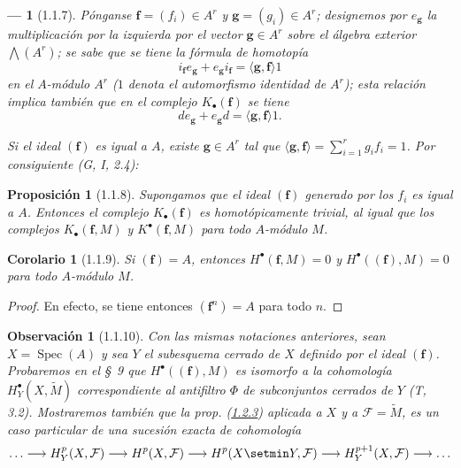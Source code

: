 \documentclass[10pt,oneside,openany]{book}
\theoremstyle{egaenv}\newtheorem*{env}{---}
\theoremstyle{egastatement}
\newtheorem*{proposition}{Proposición}
\newtheorem*{corollary}{Corolario}
\theoremstyle{egadescription}
\newtheorem*{remark}{Observación}
\begin{document}
\begin{env}[1.1.7]
\label{III.1.1.7}
\label{III.1.1.7-fr}
Pónganse $\mathbf f=(f_i)\in A^r$ y $\mathbf g=(g_i)\in A^r$; designemos por $e_{\mathbf g}$ la multiplicación por la izquierda por el vector $\mathbf g\in A^r$ sobre el álgebra exterior $\bigwedge(A^r)$; se sabe que se tiene la \emph{fórmula de homotopía}
\begin{equation}
\label{III.1.1.7.1-fr}
\tag{1.1.7.1}
i_{\mathbf f}e_{\mathbf g}+e_{\mathbf g}i_{\mathbf f}
=\langle\mathbf g,\mathbf f\rangle 1
\end{equation}
en el $A$-módulo $A^r$ ($1$ denota el automorfismo identidad de $A^r$); esta relación implica también que \emph{en el complejo $K_\bullet(\mathbf f)$} se tiene
\begin{equation}
\label{III.1.1.7.2-fr}
\tag{1.1.7.2}
de_{\mathbf g}+e_{\mathbf g}d=\langle\mathbf g,\mathbf f\rangle 1.
\end{equation}

Si el ideal $(\mathbf f)$ es igual a $A$, existe $\mathbf g\in A^r$ tal que $\langle\mathbf g,\mathbf f\rangle=\sum_{i=1}^r g_if_i=1$.
Por consiguiente (G, I, 2.4):
\end{env}

\begin{proposition}[1.1.8]
\label{III.1.1.8}
\label{III.1.1.8-fr}
Supongamos que el ideal $(\mathbf f)$ generado por los $f_i$ es igual a $A$.
Entonces el complejo $K_\bullet(\mathbf f)$ es homotópicamente trivial, al igual que los complejos $K_\bullet(\mathbf f,M)$ y $K^\bullet(\mathbf f,M)$ para todo $A$-módulo $M$.
\end{proposition}

\begin{corollary}[1.1.9]
\label{III.1.1.9}
\label{III.1.1.9-fr}
Si $(\mathbf f)=A$, entonces $H^\bullet(\mathbf f,M)=0$ y $H^\bullet((\mathbf f),M)=0$ para todo $A$-módulo $M$.
\end{corollary}

\begin{proof}
En efecto, se tiene entonces $(\mathbf f^n)=A$ para todo $n$.
\end{proof}

\begin{remark}[1.1.10]
\label{III.1.1.10}
\label{III.1.1.10-fr}
Con las mismas notaciones anteriores, sean $X=\operatorname{Spec}(A)$ y sea $Y$ el subesquema cerrado de $X$ definido por el ideal $(\mathbf f)$. Probaremos en el \S~9 que $H^\bullet((\mathbf f),M)$ es isomorfo a la cohomología $H_Y^\bullet(X,\widetilde M)$ correspondiente al antifiltro $\Phi$ de subconjuntos cerrados de $Y$ (T, 3.2). Mostraremos también que la prop. (\hyperref[III.1.2.3-fr]{1.2.3}) aplicada a $X$ y a $\mathcal F=\widetilde M$, es un caso particular de una sucesión exacta de cohomología
\[
\ldots\longrightarrow H_Y^p(X,\mathcal F)\longrightarrow H^p(X,\mathcal F)
\longrightarrow H^p(X\setmin Y,\mathcal F)\longrightarrow H_Y^{p+1}(X,\mathcal F)
\longrightarrow\ldots
\]
\end{remark}
\end{document}

